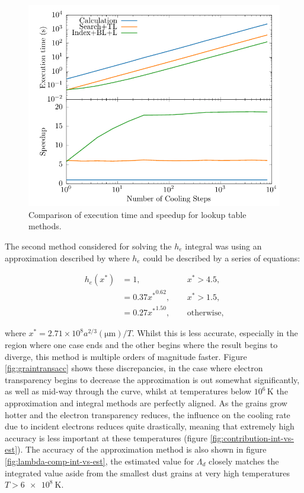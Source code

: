 \begin{figure}
  \centering
  \includegraphics{assets/lambda-dust-speedup/lambda-dust-speedup.pdf}
  \caption[Dust lookup table methods comparison]{Comparison of execution time and speedup for lookup table methods.}
  \label{fig:dust-opt-speedup}
\end{figure}


The second method considered for solving the $h_e$ integral was using an approximation described by \cite{dwek_infrared_1981} where $h_e$ could be described by a series of equations:

\begin{equation}
  \begin{alignedat}{3}
    h_e(x^*) & = 1 ,                && ~~ x^* > 4.5, \\
    & = 0.37{x^*}^{0.62} , && ~~ x^* > 1.5 , \\
    & = 0.27{x^*}^{1.50} , && ~~ \text{otherwise,}
  \end{alignedat} \label{eq:electrontransparencyestimate}
\end{equation}

\noindent
where $x^* = 2.71 \times 10^8 a^{2/3}(\si{\micro\metre}) /T$.
Whilst this is less accurate, especially in the region where one case ends and the other begins where the result begins to diverge, this method is multiple orders of magnitude faster.
Figure \ref{fig:graintransacc} shows these discrepancies, in the case where electron transparency begins to decrease the approximation is out somewhat significantly, as well as mid-way through the curve, whilst at temperatures below $10^6 \, \si{\kelvin}$ the approximation and integral methods are perfectly aligned.
As the grains grow hotter and the electron transparency reduces, the influence on the cooling rate due to incident electrons reduces quite drastically, meaning that extremely high accuracy is less important at these temperatures (figure \ref{fig:contribution-int-vs-est}).
The accuracy of the approximation method is also shown in figure \ref{fig:lambda-comp-int-vs-est}, the estimated value for $\Lambda_d$ closely matches the integrated value aside from the smallest dust grains at very high temperatures $T>\SI{6e8}{\kelvin}$.

